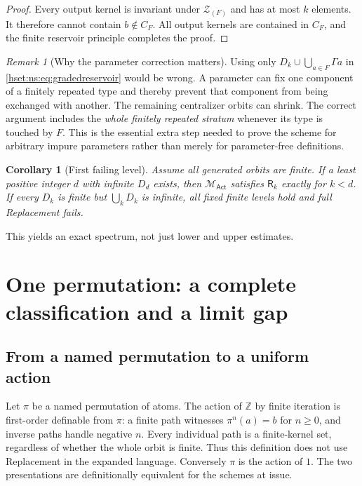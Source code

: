 \documentclass[11pt,letterpaper]{article}
\newtheorem{corollary}[corollary]{Corollary}\aliascntresetthe{corollary}
\theoremstyle{definition}
\theoremstyle{remark}
\newtheorem{remark}[remark]{Remark}\aliascntresetthe{remark}
\newcommand{\Act}{\mathsf{Act}}
\newcommand{\MAct}{\mathcal M_{\Act}}
\begin{document}
\begin{proof}
Every output kernel is invariant under $\mathcal Z_{(F)}$ and has at most $k$ elements. It therefore cannot contain $b\notin C_F$. All output kernels are contained in $C_F$, and the finite reservoir principle completes the proof.
\end{proof}

\begin{remark}[Why the parameter correction matters]\label{hset:ns:rem:parameter}
Using only $D_k\cup\bigcup_{a\in F}\Gamma a$ in \eqref{hset:ns:eq:gradedreservoir} would be wrong. A parameter can fix one component of a finitely repeated type and thereby prevent that component from being exchanged with another. The remaining centralizer orbits can shrink. The correct argument includes the \emph{whole finitely repeated stratum} whenever its type is touched by $F$. This is the essential extra step needed to prove the scheme for arbitrary impure parameters rather than merely for parameter-free definitions.
\end{remark}

\begin{corollary}[First failing level]\label{hset:ns:cor:level}
Assume all generated orbits are finite. If a least positive integer $d$ with infinite $D_d$ exists, then $\MAct$ satisfies $\mathsf R_k$ exactly for $k<d$. If every $D_k$ is finite but $\bigcup_kD_k$ is infinite, all fixed finite levels hold and full Replacement fails.
\end{corollary}
This yields an exact spectrum, not just lower and upper estimates.

\section{One permutation: a complete classification and a limit gap}
\label{hset:ns:sec:single}

\subsection{From a named permutation to a uniform action}
Let $\pi$ be a named permutation of atoms. The action of $\mathbb Z$ by finite iteration is first-order definable from $\pi$: a finite path witnesses $\pi^n(a)=b$ for $n\ge0$, and inverse paths handle negative $n$. Every individual path is a finite-kernel set, regardless of whether the whole orbit is finite. Thus this definition does not use Replacement in the expanded language. Conversely $\pi$ is the action of $1$. The two presentations are definitionally equivalent for the schemes at issue.
\end{document}
